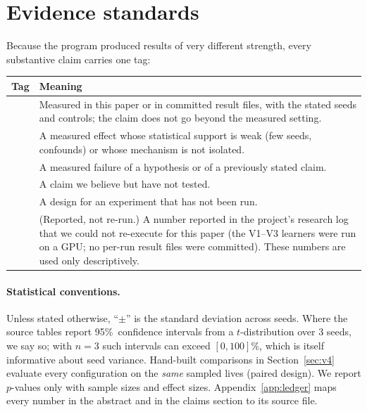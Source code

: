 \documentclass[11pt]{article}
\theoremstyle{remark}
\newcommand{\etag}[2]{\textsf{\scriptsize\textcolor{white}{\colorbox{#1}{\strut #2}}}}
\newcommand{\Dem}{\etag{tD}{DEMONSTRATED}}
\newcommand{\Sug}{\etag{tS}{SUGGESTIVE}}
\newcommand{\Neg}{\etag{tN}{NEGATIVE}}
\newcommand{\Hyp}{\etag{tH}{HYPOTHESIS}}
\newcommand{\Pro}{\etag{tP}{PROPOSED}}
\newcommand{\Rep}{\etag{tR}{REPORTED}}
\newcommand{\pct}{\%}
\begin{document}
\section{Evidence standards}
\label{sec:standards}

Because the program produced results of very different strength, every substantive claim carries one tag:

\begin{center}
\small
\begin{tabularx}{\linewidth}{>{\raggedright\arraybackslash}p{2.6cm}X}
\toprule
Tag & Meaning \\
\midrule
\Dem & Measured in this paper or in committed result files, with the stated seeds and controls; the claim does
not go beyond the measured setting. \\
\Sug & A measured effect whose statistical support is weak (few seeds, confounds) or whose mechanism is not
isolated. \\
\Neg & A measured failure of a hypothesis or of a previously stated claim. \\
\Hyp & A claim we believe but have not tested. \\
\Pro & A design for an experiment that has not been run. \\
\Rep & (Reported, not re-run.) A number reported in the project's research log that we could not re-execute for this paper (the V1--V3
learners were run on a GPU; no per-run result files were committed). These numbers are used only descriptively. \\
\bottomrule
\end{tabularx}
\end{center}

\paragraph{Statistical conventions.} Unless stated otherwise, ``$\pm$'' is the standard deviation across seeds.
Where the source tables report 95\pct\ confidence intervals from a $t$-distribution over 3 seeds, we say so;
with $n=3$ such intervals can exceed $[0,100]\pct$, which is itself informative about seed variance. Hand-built
comparisons in Section~\ref{sec:v4} evaluate every configuration on the \emph{same} sampled lives (paired
design). We report $p$-values only with sample sizes and effect sizes. Appendix~\ref{app:ledger} maps every number
in the abstract and in the claims section to its source file.
\end{document}
